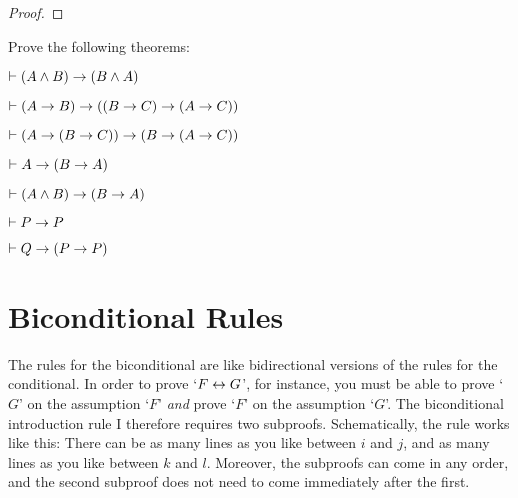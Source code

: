 \begin{proof}
\open
{} 
\close
{} 
\end{proof}

\practiceproblems



\problempart
Prove the following theorems:

\begin{earg}
\item $\vdash (A \wedge  B) \rightarrow (B \wedge  A)$
\item $\vdash (A\rightarrow B)\rightarrow ((B\rightarrow C)\rightarrow (A\rightarrow C))$
\item $\vdash (A \rightarrow (B \rightarrow C)) \rightarrow (B \rightarrow (A \rightarrow C))$
\item $\vdash A \rightarrow (B \rightarrow A)$ %
\item $\vdash (A \wedge  B) \rightarrow (B \rightarrow  A)$
\item $\vdash P \rightarrow P$
\item $\vdash Q \rightarrow (P \rightarrow P)$
\end{earg}









\section{Biconditional Rules}
The rules for the biconditional are like bidirectional versions of the rules for the conditional.  In order to prove `$F \leftrightarrow G$', for instance, you must be able to prove `$G$' on the assumption `$F$' \emph{and} prove `$F$' on the assumption `$G$'. The biconditional introduction rule {\eiff}I therefore requires two subproofs. Schematically, the rule works like this:
There can be as many lines as you like between $i$ and $j$, and as many lines as you like between $k$ and $l$. Moreover, the subproofs can come in any order, and the second subproof does not need to come immediately after the first.

